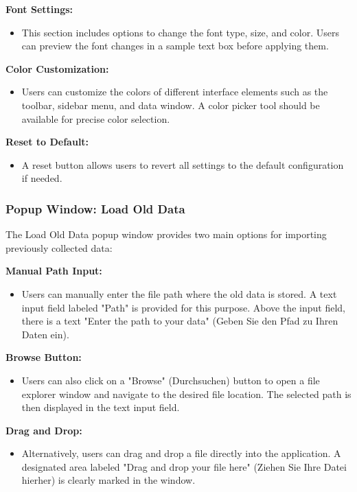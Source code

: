 \documentclass[]{scrreprt}
\begin{document}
\textbf{Font Settings:}
\begin{itemize}
    \item This section includes options to change the font type, size, and color. Users can preview the font changes in a sample text box before applying them.
\end{itemize}

\textbf{Color Customization:}
\begin{itemize}
    \item Users can customize the colors of different interface elements such as the toolbar, sidebar menu, and data window. A color picker tool should be available for precise color selection.
\end{itemize}

\textbf{Reset to Default:}
\begin{itemize}
    \item A reset button allows users to revert all settings to the default configuration if needed.
\end{itemize}

\subsubsection{Popup Window: Load Old Data} \label{cap:PopupWindow_loadoldata}

The Load Old Data popup window provides two main options for importing previously collected data:

\textbf{Manual Path Input:}
\begin{itemize}
    \item Users can manually enter the file path where the old data is stored. A text input field labeled "Path" is provided for this purpose. Above the input field, there is a text "Enter the path to your data" (Geben Sie den Pfad zu Ihren Daten ein).
\end{itemize}

\textbf{Browse Button:}
\begin{itemize}
    \item Users can also click on a "Browse" (Durchsuchen) button to open a file explorer window and navigate to the desired file location. The selected path is then displayed in the text input field.
\end{itemize}

\textbf{Drag and Drop:}
\begin{itemize}
    \item Alternatively, users can drag and drop a file directly into the application. A designated area labeled "Drag and drop your file here" (Ziehen Sie Ihre Datei hierher) is clearly marked in the window.
\end{itemize}
\end{document}
